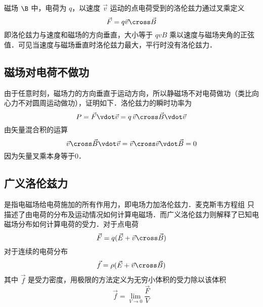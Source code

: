 
磁场 $\B$ 中，电荷为 $q$，以速度 $\vec v$ 运动的点电荷受到的洛伦兹力通过叉乘定义
\begin{equation}
\vec F = q\vec v \cross \vec B
\end{equation}
即洛伦兹力与速度和磁场的方向垂直，大小等于 $qvB$ 乘以速度与磁场夹角的正弦值．可见当速度与磁场垂直时洛伦兹力最大，平行时没有洛伦兹力．

\subsection{磁场对电荷不做功}
由于任意时刻，磁场力的方向垂直于运动方向，所以静磁场不对电荷做功（类比向心力不对圆周运动做功），证明如下．洛伦兹力的瞬时功率为
\begin{equation}
P = \vec F \vdot \vec v = q\,\vec v \cross \vec B \vdot \vec v
\end{equation}
由矢量混合积的运算 %
\begin{equation}
\vec v \cross \vec B \vdot \vec v = \vec v \cross \vec v \vdot \vec B = 0
\end{equation}
因为矢量叉乘本身等于0．


\subsection{广义洛伦兹力}
 是指电磁场给电荷施加的所有作用力，即电场力加洛伦兹力．麦克斯韦方程组%
只描述了由电荷的分布及运动情况如何计算电磁场．而广义洛伦兹力则解释了已知电磁场分布如何计算电荷的受力．对于点电荷
\begin{equation}
\vec F = q ( {\vec E + \vec v \cross \vec B})
\end{equation}
对于连续的电荷分布
\begin{equation}
\vec f = \rho ({\vec E + \vec v \cross \vec B})
\end{equation}
其中 $\vec f$ 是受力密度，用极限的方法定义为无穷小体积的受力除以该体积
\begin{equation}
\vec f = \lim_{V \to 0} \frac{{\vec F}}{V}
\end{equation}

